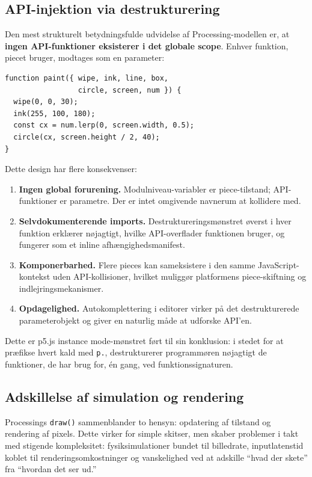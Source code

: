 \documentclass[10pt,letterpaper,twocolumn]{article}
\begin{document}
\subsection{API-injektion via destrukturering}

Den mest strukturelt betydningsfulde udvidelse af Processing-modellen er, at \textbf{ingen API-funktioner eksisterer i det globale scope}. Enhver funktion, piecet bruger, modtages som en parameter:

\begin{lstlisting}[style=acjsstyle,caption={API-destrukturering i AC.}]
function paint({ wipe, ink, line, box,
                 circle, screen, num }) {
  wipe(0, 0, 30);
  ink(255, 100, 180);
  const cx = num.lerp(0, screen.width, 0.5);
  circle(cx, screen.height / 2, 40);
}
\end{lstlisting}

Dette design har flere konsekvenser:

\begin{enumerate}
  \item \textbf{Ingen global forurening.} Modulniveau-variabler er piece-tilstand; API-funktioner er parametre. Der er intet omgivende navnerum at kollidere med.
  \item \textbf{Selvdokumenterende imports.} Destruktureringsmønstret øverst i hver funktion erklærer nøjagtigt, hvilke API-overflader funktionen bruger, og fungerer som et inline afhængighedsmanifest.
  \item \textbf{Komponerbarhed.} Flere pieces kan sameksistere i den samme JavaScript-kontekst uden API-kollisioner, hvilket muliggør platformens piece-skiftning og indlejringsmekanismer.
  \item \textbf{Opdagelighed.} Autokomplettering i editorer virker på det destrukturerede parameterobjekt og giver en naturlig måde at udforske API'en.
\end{enumerate}

Dette er p5.js instance mode-mønstret ført til sin konklusion: i stedet for at præfikse hvert kald med \texttt{p.}, destrukturerer programmøren nøjagtigt de funktioner, de har brug for, én gang, ved funktionssignaturen.

\subsection{Adskillelse af simulation og rendering}
\label{sec:simsep}

Processings \texttt{draw()} sammenblander to hensyn: opdatering af tilstand og rendering af pixels. Dette virker for simple skitser, men skaber problemer i takt med stigende kompleksitet: fysiksimulationer bundet til billedrate, inputlatenstid koblet til renderingsomkostninger og vanskelighed ved at adskille ``hvad der skete'' fra ``hvordan det ser ud.''
\end{document}
